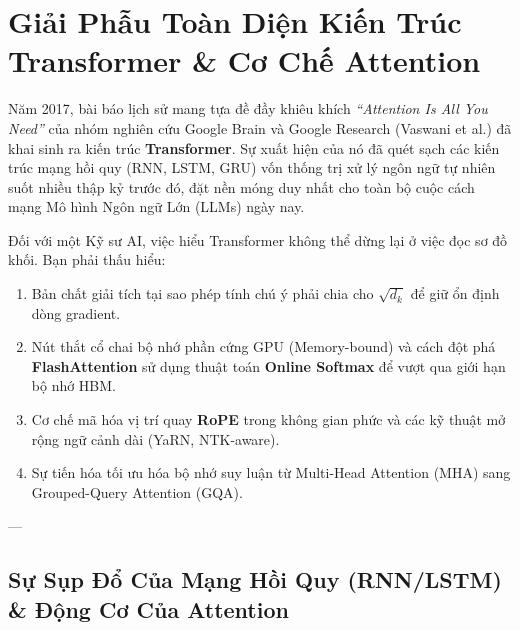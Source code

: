 
\chapter{Giải Phẫu Toàn Diện Kiến Trúc Transformer \& Cơ Chế Attention}
\label{ch:transformer-architecture}

Năm 2017, bài báo lịch sử mang tựa đề đầy khiêu khích \textit{``Attention Is All You Need''} của nhóm nghiên cứu Google Brain và Google Research (Vaswani et al.) đã khai sinh ra kiến trúc \textbf{Transformer}. Sự xuất hiện của nó đã quét sạch các kiến trúc mạng hồi quy (RNN, LSTM, GRU) vốn thống trị xử lý ngôn ngữ tự nhiên suốt nhiều thập kỷ trước đó, đặt nền móng duy nhất cho toàn bộ cuộc cách mạng Mô hình Ngôn ngữ Lớn (LLMs) ngày nay.

Đối với một Kỹ sư AI, việc hiểu Transformer không thể dừng lại ở việc đọc sơ đồ khối. Bạn phải thấu hiểu:
\begin{enumerate}
  \item Bản chất giải tích tại sao phép tính chú ý phải chia cho $\sqrt{d_k}$ để giữ ổn định dòng gradient.
  \item Nút thắt cổ chai bộ nhớ phần cứng GPU (Memory-bound) và cách đột phá \textbf{FlashAttention} sử dụng thuật toán \textbf{Online Softmax} để vượt qua giới hạn bộ nhớ HBM.
  \item Cơ chế mã hóa vị trí quay \textbf{RoPE} trong không gian phức và các kỹ thuật mở rộng ngữ cảnh dài (YaRN, NTK-aware).
  \item Sự tiến hóa tối ưu hóa bộ nhớ suy luận từ Multi-Head Attention (MHA) sang Grouped-Query Attention (GQA).
\end{enumerate}

---

\section{Sự Sụp Đổ Của Mạng Hồi Quy (RNN/LSTM) \& Động Cơ Của Attention}
\label{sec:rnn-failure-and-motivation}


